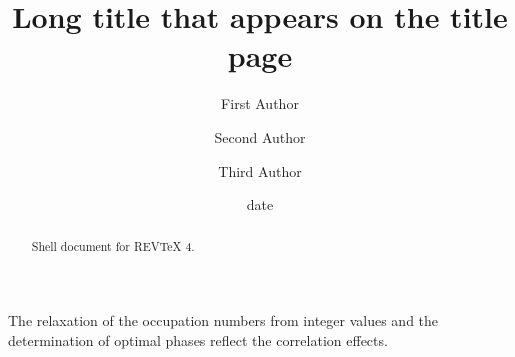 \documentclass[aps,preprint]{revtex4}%
\begin{document}
\title[Short title for running header]{Long title that appears on the title page}
\author{First Author}
\author{Second Author}
\author{Third Author}

\begin{abstract}
Shell document for REV\TeX{} 4.

\end{abstract}
\date[Date text]{date}




\maketitle
\tableofcontents


The relaxation of the occupation numbers from integer values and the
determination of optimal phases reflect the correlation effects.%
\end{document}
